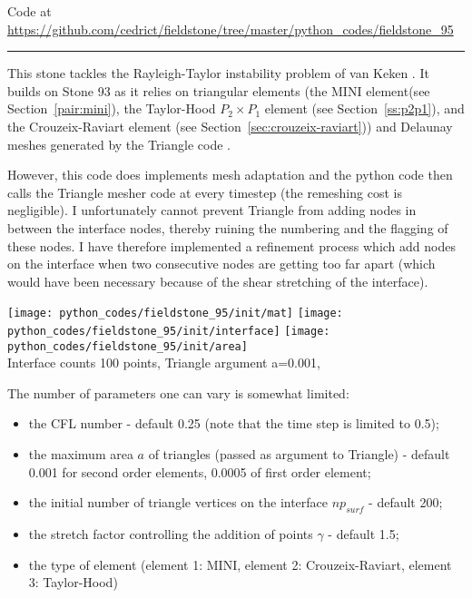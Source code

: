 

\begin{center}
Code at \url{https://github.com/cedrict/fieldstone/tree/master/python_codes/fieldstone_95}
\end{center}

\par\noindent\rule{\textwidth}{0.4pt}


This stone tackles the Rayleigh-Taylor instability problem of van Keken \etal \cite{vaks97}. 
It builds on Stone 93 as it relies on triangular elements (the MINI element(see Section~\ref{pair:mini}), 
the Taylor-Hood $P_2\times P_1$ element (see Section~\ref{ss:p2p1}), 
and the Crouzeix-Raviart element (see Section~\ref{sec:crouzeix-raviart})) and Delaunay meshes
generated by the Triangle code \cite{shew14}.  

However, this code does implements mesh adaptation and the python code then calls the Triangle mesher code
at every timestep (the remeshing cost is negligible).
I unfortunately cannot prevent Triangle from adding nodes in between the interface nodes, thereby 
ruining the numbering and the flagging of these nodes. I have therefore implemented a refinement 
process which add nodes on the interface when two consecutive nodes are getting too far apart (which 
would have been necessary because of the shear stretching of the interface). 

\begin{center}
\texttt{[image: python\_codes/fieldstone\_95/init/mat]}
\texttt{[image: python\_codes/fieldstone\_95/init/interface]}
\texttt{[image: python\_codes/fieldstone\_95/init/area]}\\
{\captionfont Interface counts 100 points, Triangle argument a=0.001, } 
\end{center}

The number of parameters one can vary is somewhat limited:
\begin{itemize}
\item the CFL number - default 0.25 (note that the time step is limited to 0.5);
\item the maximum area $a$ of triangles (passed as argument to Triangle) - default 0.001 for second order elements,
0.0005 of first order element;
\item the initial number of triangle vertices on the interface $np_{surf}$ - default 200;
\item the stretch factor controlling the addition of points $\gamma$ - default 1.5;
\item the type of element (element 1: MINI, element 2: Crouzeix-Raviart, element 3: Taylor-Hood)  
\end{itemize}

